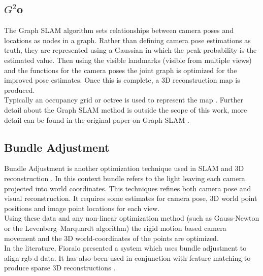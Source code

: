 
\subsection{$G^2$o}
\label{Sec:G20}
The Graph SLAM algorithm sets relationships between camera poses and locations as nodes in a graph. Rather than defining camera pose estimations as truth, they are represented using a Gaussian in which the peak probability is the estimated value. Then using the visible landmarks (visible from multiple views) and the functions for the camera poses the joint graph is optimized for the improved pose estimates. Once this is complete, a 3D reconstruction map is produced. \\

Typically an occupancy grid or octree is used to represent the map \cite{Wurm10Octomap}. Further detail about the Graph SLAM method is outside the scope of this work, more detail can be found in the original paper on Graph SLAM \cite{Kummerle11G}. \\

\subsection{Bundle Adjustment}
\label{sec:ba}
Bundle Adjustment is another optimization technique used in SLAM and 3D reconstruction \cite{Lourakis09Sba}. In this context bundle refers to the light leaving each camera projected into world coordinates. This techniques refines both camera pose and visual reconstruction. It requires some estimates for camera pose, 3D world point positions and image point locations for each view. \\

Using these data and any non-linear optimization method (such as Gauss-Newton or the Levenberg–Marquardt algorithm) the rigid motion based camera movement and the 3D world-coordinates of the points are optimized. \\

In the literature, Fioraio \cite{Fioraio11Realtime} presented a system which uses bundle adjustment to align rgb-d data. It has also been used in conjunction with feature matching to produce sparse 3D reconstructions \cite{Klein07Parallel,Agarwal09Building}.
